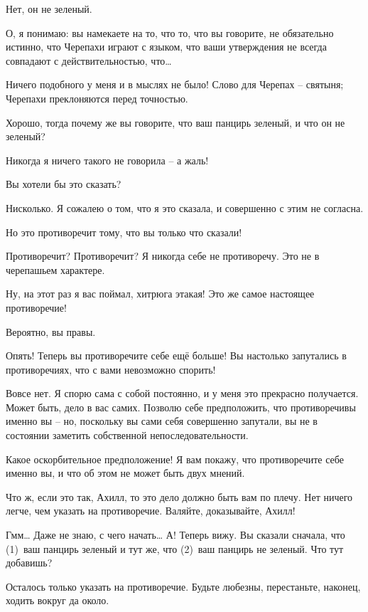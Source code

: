 \documentclass[../main.tex]{subfiles}
\begin{document}
\begin{dialogue}
 Нет, он не зеленый.

 О, я понимаю: вы намекаете на то, что то, что вы говорите, не обязательно истинно, что Черепахи играют с языком, что ваши утверждения не всегда совпадают с действительностью, что\ldots{}

 Ничего подобного у меня и в мыслях не было! Слово для Черепах \--- святыня; Черепахи преклоняются перед точностью.

 Хорошо, тогда почему же вы говорите, что ваш панцирь зеленый, и что он не зеленый?

 Никогда я ничего такого не говорила \--- а жаль!

 Вы хотели бы это сказать?

 Нисколько. Я сожалею о том, что я это сказала, и совершенно с этим не согласна.

 Но это противоречит тому, что вы только что сказали!

 Противоречит? Противоречит? Я никогда себе не противоречу. Это не в черепашьем характере.

 Ну, на этот раз я вас поймал, хитрюга этакая! Это же самое настоящее противоречие!

 Вероятно, вы правы.

 Опять! Теперь вы противоречите себе ещё больше! Вы настолько запутались в противоречиях, что с вами невозможно спорить!

 Вовсе нет. Я спорю сама с собой постоянно, и у меня это прекрасно получается. Может быть, дело в вас самих. Позволю себе предположить, что противоречивы именно вы \--- но, поскольку вы сами себя совершенно запутали, вы не в состоянии заметить собственной непоследовательности.

 Какое оскорбительное предположение! Я вам покажу, что противоречите себе именно вы, и что об этом не может быть двух мнений.

 Что ж, если это так, Ахилл, то это дело должно быть вам по плечу. Нет ничего легче, чем указать на противоречие. Валяйте, доказывайте, Ахилл!

 Гмм\ldots{} Даже не знаю, с чего начать\ldots{} А! Теперь вижу. Вы сказали сначала, что (1)~ваш панцирь зеленый и тут же, что (2)~ваш панцирь не зеленый. Что тут добавишь?

 Осталось только указать на противоречие. Будьте любезны, перестаньте, наконец, ходить вокруг да около.


\end{dialogue}
\end{document}
